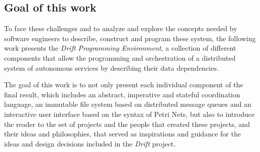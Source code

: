 \subsection{Goal of this work}
To face these challenges and to analyze and explore the
concepts needed by software engineers to describe, construct and program
these system, the following work presents the
\textit{Drift Programming Environment}, a collection of different
components that allow the programming and orchestration of a
distributed system of autonomous services by describing
their data dependencies.

The goal of this work is to not only present each individual
component of the final result, which includes an abstract,
imperative and stateful coordination language, an immutable
file system based on distributed message queues and an interactive
user interface based on the syntax of Petri Nets,
but also to introduce the reader to the set of projects and the
people that created these projects, and their ideas and philosophies,
that served as inspirations and guidance for the ideas and design decisions
included in the \textit{Drift} project.




